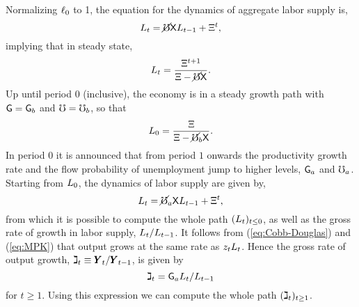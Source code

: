 \documentclass[titlepage,abstract,letterpaper]{econtex}
\renewcommand{\GDPLev}{\ensuremath{\pmb{Y}}}
\begin{document}
Normalizing $\ell_0$ to 1, the equation for the dynamics of aggregate labor supply is,
\begin{equation*}
L_t=\cancel{\mho} \mathsf{X} L_{t-1}+\Xi^t,
\end{equation*}
implying that in steady state,
\begin{equation*}
L_t = \frac{\Xi^{t+1}}{\Xi-\cancel{\mho} \mathsf{X}}.
\end{equation*}
Up until period $0$ (inclusive), the economy is in a steady growth path with $\mathsf{G}=\mathsf{G}_b$ and $\mho=\mho_b$, so that
\begin{equation*}
L_0=\frac{\Xi}{\Xi-\cancel{\mho}_b \mathsf{X}}.
\end{equation*}
In period $0$ it is announced that from period $1$ onwards the productivity growth rate and the flow probability of unemployment jump to higher levels, $\mathsf{G}_a$ and $\mho_a$. Starting from $L_0$, the dynamics of labor supply are given by,
\begin{equation*}
L_t=\cancel{\mho}_a \mathsf{X} L_{t-1}+\Xi^t,
\end{equation*}
from which it is possible to compute the whole path $(L_t)_{t\leq0}$, as well as the gross rate of growth in labor supply, $L_t/L_{t-1}$. It follows from (\ref{eq:Cobb-Douglas}) and (\ref{eq:MPK}) that output grows at the same rate as $z_t L_t$. Hence the gross rate of output growth, $\GDPGro_{t} \equiv \GDPLev_t/\GDPLev_{t-1}$, is given by
\begin{equation*}
\gimel_{t}=\mathsf{G}_a L_t/L_{t-1}
\end{equation*}
for $t \geq 1$. Using this expression we can compute the whole path $(\gimel_{t})_{t \geq 1}$.
\end{document}
